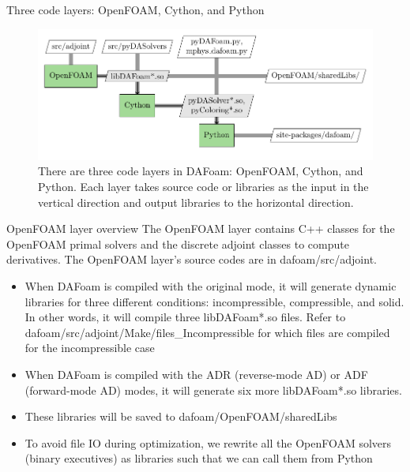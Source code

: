 \documentclass{bredelebeamer}
\begin{document}
\begin{frame}{Three code layers: OpenFOAM, Cython, and Python}
\begin{figure}
\includegraphics[width=1.05\linewidth]{images/dafoam_layers.pdf} 
\caption{There are three code layers in DAFoam: OpenFOAM, Cython, and Python. Each layer takes source code or libraries as the input in the vertical direction and output libraries to the horizontal direction.}
\end{figure}
\end{frame}


\begin{frame}[fragile]{OpenFOAM layer overview}
  The OpenFOAM layer contains C++ classes for the OpenFOAM primal solvers and the discrete adjoint classes to compute derivatives. The OpenFOAM layer's source codes are in dafoam/src/adjoint.
  \begin{itemize}
    \setlength\itemsep{1em}
    \item When DAFoam is compiled with the original mode, it will generate dynamic libraries for three different conditions: incompressible, compressible, and solid. In other words, it will compile three libDAFoam*.so files. Refer to dafoam/src/adjoint/Make/files\_Incompressible for which files are compiled for the incompressible case
    \item When DAFoam is compiled with the ADR (reverse-mode AD) or ADF (forward-mode AD) modes, it will generate six more libDAFoam*.so libraries.
    \item These libraries will be saved to dafoam/OpenFOAM/sharedLibs
    \item To avoid file IO during optimization, we rewrite all the OpenFOAM solvers (binary executives) as libraries such that we can call them from Python
  \end{itemize}
\end{frame}
\end{document}
